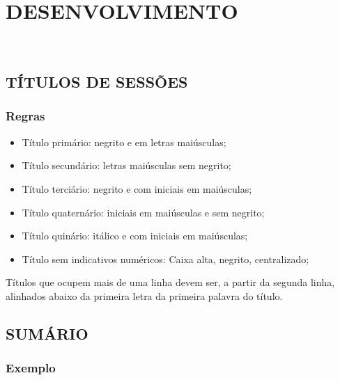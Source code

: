 \section{DESENVOLVIMENTO}

\lipsum[2] \\

\lipsum[3]

\subsection{TÍTULOS DE SESSÕES}

\subsubsection{Regras}

\begin{itemize} 
    \item Título primário: negrito e em letras maiúsculas;
    \item Título secundário: letras maiúsculas sem negrito;
    \item Título terciário: negrito e com iniciais em maiúsculas;
    \item Título quaternário: iniciais em maiúsculas e sem negrito;
    \item Título quinário: itálico e com iniciais em maiúsculas;
    \item Título sem indicativos numéricos: Caixa alta, negrito, centralizado;
\end{itemize}

Títulos que ocupem mais de uma linha devem ser, a partir da segunda linha, alinhados abaixo da primeira letra da primeira palavra do título.

\newpage

\subsection{SUMÁRIO}

\subsubsection{Exemplo}

